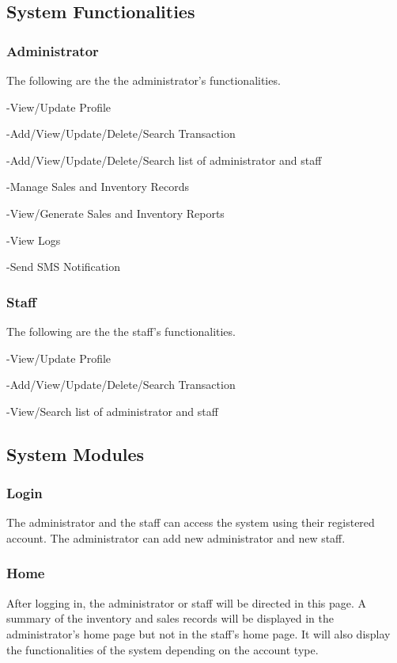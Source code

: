 \documentclass[journal]{./IEEE/IEEEtran}
\begin{document}
\subsection{System Functionalities}

\subsubsection{Administrator}
The following are the the administrator's functionalities.

-View/Update Profile

-Add/View/Update/Delete/Search Transaction

-Add/View/Update/Delete/Search list of administrator and staff

-Manage Sales and Inventory Records

-View/Generate Sales and Inventory Reports

-View Logs

-Send SMS Notification
	
\subsubsection{Staff}
The following are the the staff's functionalities.

-View/Update Profile

-Add/View/Update/Delete/Search Transaction 

-View/Search list of administrator and staff

\subsection{System Modules}

\subsubsection{Login}
The administrator and the staff can access the system using their registered account. The administrator can add new administrator and new staff.

\subsubsection{Home}
After logging in, the administrator or staff will be directed in this page. A summary of the inventory and sales records will be displayed 	in the administrator’s home page but not in the staff’s home page. It will also display the functionalities of the system depending on the account type.
\end{document}
